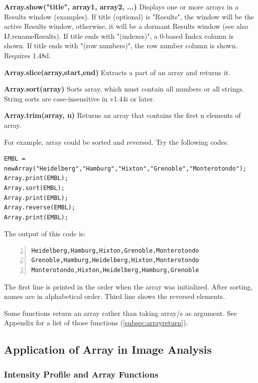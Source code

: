 \documentclass[11pt,a4paper,oneside]{report}
\newenvironment{indentCom}
{\begin{list}{}
         {\setlength{\leftmargin}{1em}}
         \item[]
}
{\end{list}}
\begin{document}
\begin{shaded}
\begin{indentCom}
\item \textbf{Array.show("title", array1, array2, ...)} Displays one or more arrays in a Results window (examples). If title (optional) is "Results", the window will be the active Results window, otherwise, it will be a dormant Results window (see also IJ.renameResults). If title ends with "(indexes)", a 0-based Index column is shown. If title ends with "(row numbers)", the row number column is shown. Requires 1.48d. 
\item \textbf{Array.slice(array,start,end)} Extracts a part of an array and
returns it. 
\item \textbf{Array.sort(array)} Sorts array, which must contain all numbers
or all strings. String sorts are case-insensitive in v1.44i or later.
\item \textbf{Array.trim(array, n)} Returns an array that contains the first n
elements of array.
\end{indentCom}\end{shaded}

For example, array could be sorted and reversed. Try the following codes. 

\begin{lstlisting}[numbers=none]
EMBL = newArray("Heidelberg","Hamburg","Hixton","Grenoble","Monterotondo");
Array.print(EMBL);
Array.sort(EMBL);
Array.print(EMBL);
Array.reverse(EMBL);
Array.print(EMBL);
\end{lstlisting} 
The output of this code is:
\begin{lstlisting}[numbers=left]
Heidelberg,Hamburg,Hixton,Grenoble,Monterotondo
Grenoble,Hamburg,Heidelberg,Hixton,Monterotondo
Monterotondo,Hixton,Heidelberg,Hamburg,Grenoble
\end{lstlisting} 
The first line is printed in the order when the array was initialized. After
sorting, names are in alphabetical order. Third line shows the reversed
elements. 

Some functions return an array rather than taking array/s as argument. See Appendix for a list of those functions (\ref{subsec:arrayreturn}).
   \subsection{Application of Array in Image Analysis}
\subsubsection{Intensity Profile and Array Functions}
\end{document}

